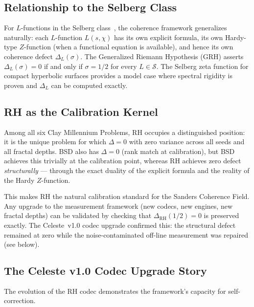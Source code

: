 \documentclass[11pt]{article}
\theoremstyle{remark}
\begin{document}
\subsection{Relationship to the Selberg Class}

For $L$-functions in the Selberg class~\cite{Selberg}, the coherence framework
generalizes naturally: each $L$-function $L(s,\chi)$ has its own explicit formula,
its own Hardy-type $Z$-function (when a functional equation is available), and hence
its own coherence defect $\Delta_L(\sigma)$.
The Generalized Riemann Hypothesis (GRH) asserts $\Delta_L(\sigma)=0$ if and only if
$\sigma=1/2$ for every $L\in\mathcal{S}$.
The Selberg zeta function for compact hyperbolic surfaces provides a model case where
spectral rigidity is proven and $\Delta_L$ can be computed exactly.

\subsection{RH as the Calibration Kernel}
\label{subsec:disc-calibration}

Among all six Clay Millennium Problems, RH occupies a distinguished position: it is
the unique problem for which $\Delta = 0$ with zero variance across all seeds and all
fractal depths.
BSD also has $\Delta = 0$ (rank match at calibration), but BSD achieves this trivially
at the calibration point, whereas RH achieves zero defect \emph{structurally} ---
through the exact duality of the explicit formula and the reality of the Hardy
$Z$-function.

This makes RH the natural calibration standard for the Sanders Coherence Field.
Any upgrade to the measurement framework (new codecs, new engines, new fractal
depths) can be validated by checking that $\Delta_{\mathrm{RH}}(1/2) = 0$ is
preserved exactly.
The Celeste~v1.0 codec upgrade confirmed this: the structural defect remained at zero
while the noise-contaminated off-line measurement was repaired (see below).

\subsection{The Celeste v1.0 Codec Upgrade Story}
\label{subsec:disc-celeste}

The evolution of the RH codec demonstrates the framework's capacity for self-correction.
\end{document}
